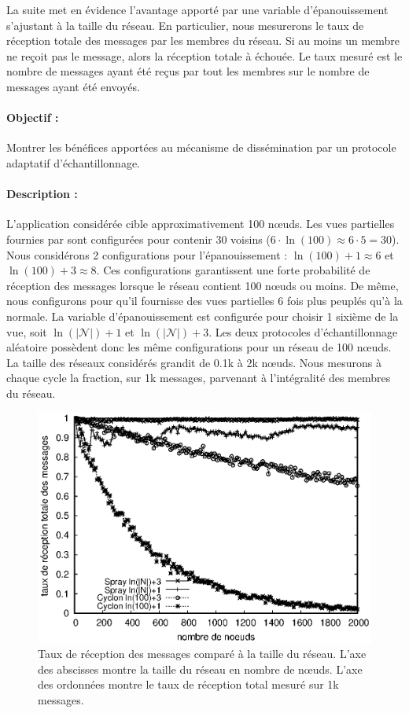 La suite met en évidence l'avantage apporté par une variable d'épanouissement
s'ajustant à la taille du réseau. En particulier, nous mesurerons le taux de
réception totale des messages par les membres du réseau. Si au moins un membre
ne reçoit pas le message, alors la réception totale à échouée. Le taux mesuré
est le nombre de messages ayant été reçus par tout les membres sur le nombre de
messages ayant été envoyés.

\paragraph{Objectif :} Montrer les bénéfices apportées au mécanisme de
dissémination par un protocole adaptatif d'échantillonnage.

\paragraph{Description :} L'application considérée cible approximativement 100
nœuds. Les vues partielles fournies par \CYCLON sont configurées pour contenir
30 voisins ($6 \cdot \ln(100) \approx 6 \cdot 5 = 30$). Nous considérons 2
configurations pour l'épanouissement : $\ln(100)+1 \approx 6$ et
$\ln(100)+3 \approx 8$. Ces configurations garantissent une forte probabilité de
réception des messages lorsque le réseau contient 100 nœuds ou moins. De même,
nous configurons \SPRAY pour qu'il fournisse des vues partielles 6 fois plus
peuplés qu'à la normale. La variable d'épanouissement est configurée pour
choisir 1 sixième de la vue, soit $\ln(|\mathcal{N}|)+1$ et
$\ln(|\mathcal{N}|)+3$.  Les deux protocoles d'échantillonnage aléatoire
possèdent donc les même configurations pour un réseau de 100 nœuds. La taille
des réseaux considérés grandit de 0.1k à 2k nœuds. Nous mesurons à chaque cycle
la fraction, sur 1k messages, parvenant à l'intégralité des membres du réseau.

\begin{figure}
  \begin{center}
    \includegraphics[width=.8\textwidth]{img/spray/hardrate.eps}
    \caption[Taux de réception des messages comparé à la taille du
    réseau.]{\label{net:fig:hardrate} Taux de réception des messages comparé à
      la taille du réseau. L'axe des abscisses montre la taille du réseau en
      nombre de nœuds. L'axe des ordonnées montre le taux de réception total
      mesuré sur 1k messages.}
  \end{center}
\end{figure}

